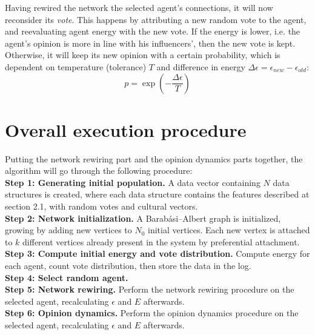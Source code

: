 \documentclass[12pt,openright,twoside]{book}
\begin{document}
Having rewired the network the selected agent's connections, it will now reconsider its \textit{vote}. This happens by attributing a new random vote to the agent, and reevaluating agent energy with the new vote. If the energy is lower, i.e. the agent's opinion is more in line with his influencers', then the new vote is kept. Otherwise, it will keep its new opinion with a certain probability, which is dependent on temperature (tolerance) $T$ and difference in energy $\Delta\epsilon=\epsilon_{new}-\epsilon_{old}$:\\

\begin{equation}
p=\exp \left( -\frac{\Delta\epsilon}{T} \right)
\label{switch_prob}
\end{equation}

\vspace{14pt}

\section{Overall execution procedure}

Putting the network rewiring part and the opinion dynamics parts together, the algorithm will go through the following procedure:\\

\textbf{Step 1: Generating initial population.} A data vector containing $N$ data structures is created, where each data structure contains the features described at section 2.1, with random votes and cultural vectors.\\

\textbf{Step 2: Network initialization.} A Barabási–Albert graph is initialized, growing by adding new vertices to $N_0$ initial vertices. Each new vertex is attached to $k$ different vertices already present in the system by preferential attachment.\\

\textbf{Step 3: Compute initial energy and vote distribution.} Compute energy for each agent, count vote distribution, then store the data in the log.\\

\textbf{Step 4: Select random agent.}\\

\textbf{Step 5: Network rewiring.} Perform the network rewiring procedure on the selected agent, recalculating $\epsilon$ and $E$ afterwards.\\

\textbf{Step 6: Opinion dynamics.} Perform the opinion dynamics procedure on the selected agent, recalculating $\epsilon$ and $E$ afterwards.\\
\end{document}
